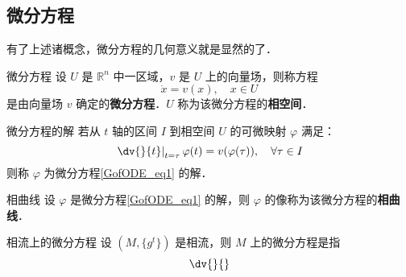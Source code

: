 \subsection{微分方程}
有了上述诸概念，微分方程的几何意义就是显然的了．
\begin{definition}{微分方程}
设 $U$ 是 $\mathbb R^n$ 中一区域，$v$ 是 $U$ 上的向量场，则称方程
\begin{equation}\label{GofODE_eq1}
\dot x=v(x),\quad x\in U
\end{equation}
是由向量场 $v$ 确定的\textbf{微分方程}．$U$ 称为该微分方程的\textbf{相空间}． 
\end{definition}

\begin{definition}{微分方程的解}
若从 $t$ 轴的区间 $I$ 到相空间 $U$ 的可微映射 $\varphi$ 满足：
\begin{equation}
\left.\dv{}{t}\right|_{t=\tau}\varphi(t)=v(\varphi(\tau)),\quad\forall\tau\in I
\end{equation}
则称 $\varphi$ 为微分方程\autoref{GofODE_eq1} 的解．
\end{definition}
\begin{definition}{相曲线}
设 $\varphi$ 是微分方程\autoref{GofODE_eq1} 的解，则 $\varphi$ 的像称为该微分方程的\textbf{相曲线}．
\end{definition}
\begin{definition}{相流上的微分方程}
设 $(M,\{g^t\})$ 是相流，则 $M$ 上的微分方程是指
\begin{equation}
\dv{}{}
\end{equation}

\end{definition}